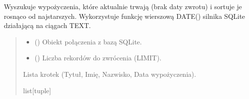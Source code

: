 \documentclass[letterpaper,10pt,english]{sphinxmanual}
\begin{document}
\begin{fulllineitems}
\label{\detokenize{rozdzial_5/index:biblioteka_zapytania.get_najdluzej_przetrzymywane}}
\pysigstartsignatures
\pysiglinewithargsret
{}
{\sphinxparamcomma {}}
{}
\pysigstopsignatures
\sphinxAtStartPar
Wyszukuje wypożyczenia, które aktualnie trwają (brak daty zwrotu) i sortuje je rosnąco od 
najstarszych. Wykorzystuje funkcję wierszową DATE() silnika SQLite działającą na ciągach TEXT.
\begin{quote}\begin{description}
\begin{itemize}
\item {} 
\sphinxAtStartPar
{} () \textendash{} Obiekt połączenia z bazą SQLite.

\item {} 
\sphinxAtStartPar
{} () \textendash{} Liczba rekordów do zwrócenia (LIMIT).

\end{itemize}

\sphinxAtStartPar
Lista krotek (Tytuł, Imię, Nazwisko, Data wypożyczenia).

\sphinxAtStartPar
list{[}tuple{]}

\end{description}\end{quote}

\end{fulllineitems}

\end{document}
